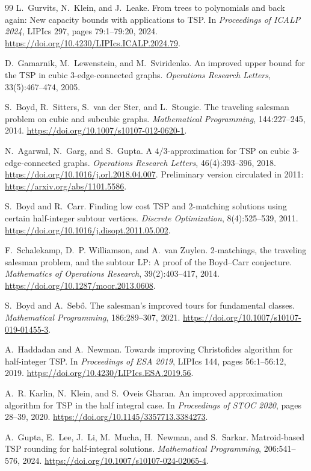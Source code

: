 \documentclass[11pt]{amsart}
\newcommand{\1}{\mathbbm{1}}
\begin{document}
\begin{thebibliography}{99}
L.~Gurvits, N.~Klein, and J.~Leake.
From trees to polynomials and back again: New capacity bounds with
applications to TSP.
In \emph{Proceedings of ICALP 2024}, LIPIcs 297, pages 79:1--79:20, 2024.
\url{https://doi.org/10.4230/LIPIcs.ICALP.2024.79}.

D.~Gamarnik, M.~Lewenstein, and M.~Sviridenko.
An improved upper bound for the TSP in cubic 3-edge-connected graphs.
\emph{Operations Research Letters}, 33(5):467--474, 2005.

S.~Boyd, R.~Sitters, S.~van der Ster, and L.~Stougie.
The traveling salesman problem on cubic and subcubic graphs.
\emph{Mathematical Programming}, 144:227--245, 2014.
\url{https://doi.org/10.1007/s10107-012-0620-1}.

N.~Agarwal, N.~Garg, and S.~Gupta.
A $4/3$-approximation for TSP on cubic $3$-edge-connected graphs.
\emph{Operations Research Letters}, 46(4):393--396, 2018.
\url{https://doi.org/10.1016/j.orl.2018.04.007}.
Preliminary version circulated in 2011:
\url{https://arxiv.org/abs/1101.5586}.

S.~Boyd and R.~Carr.
Finding low cost TSP and 2-matching solutions using certain half-integer
subtour vertices.
\emph{Discrete Optimization}, 8(4):525--539, 2011.
\url{https://doi.org/10.1016/j.disopt.2011.05.002}.

F.~Schalekamp, D.~P. Williamson, and A.~van Zuylen.
2-matchings, the traveling salesman problem, and the subtour LP:
A proof of the Boyd--Carr conjecture.
\emph{Mathematics of Operations Research}, 39(2):403--417, 2014.
\url{https://doi.org/10.1287/moor.2013.0608}.

S.~Boyd and A.~Seb\H{o}.
The salesman's improved tours for fundamental classes.
\emph{Mathematical Programming}, 186:289--307, 2021.
\url{https://doi.org/10.1007/s10107-019-01455-3}.

A.~Haddadan and A.~Newman.
Towards improving Christofides algorithm for half-integer TSP.
In \emph{Proceedings of ESA 2019}, LIPIcs 144, pages 56:1--56:12, 2019.
\url{https://doi.org/10.4230/LIPIcs.ESA.2019.56}.

A.~R. Karlin, N.~Klein, and S.~Oveis Gharan.
An improved approximation algorithm for TSP in the half integral case.
In \emph{Proceedings of STOC 2020}, pages 28--39, 2020.
\url{https://doi.org/10.1145/3357713.3384273}.

A.~Gupta, E.~Lee, J.~Li, M.~Mucha, H.~Newman, and S.~Sarkar.
Matroid-based TSP rounding for half-integral solutions.
\emph{Mathematical Programming}, 206:541--576, 2024.
\url{https://doi.org/10.1007/s10107-024-02065-4}.


\end{thebibliography}
\end{document}
